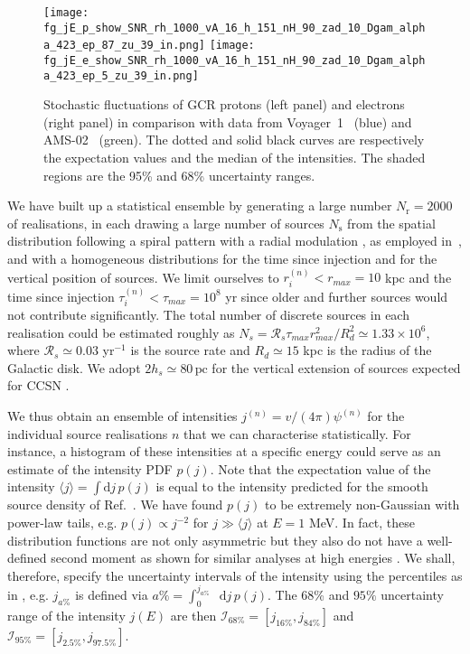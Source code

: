 \documentclass[%
reprint,
amsmath,amssymb,
aps,
superscriptaddress,
preprintnumbers
]{revtex4-2}
\newcommand*\df{\mathop{}\!\mathrm{d}}
\begin{document}
\begin{figure*}[htpb]
\centerline{
\texttt{[image: fg\_jE\_p\_show\_SNR\_rh\_1000\_vA\_16\_h\_151\_nH\_90\_zad\_10\_Dgam\_alpha\_423\_ep\_87\_zu\_39\_in.png]}
\texttt{[image: fg\_jE\_e\_show\_SNR\_rh\_1000\_vA\_16\_h\_151\_nH\_90\_zad\_10\_Dgam\_alpha\_423\_ep\_5\_zu\_39\_in.png]}
}
\caption{Stochastic fluctuations of GCR protons (left panel) and electrons (right panel) in comparison with data from Voyager~1~\cite{cummings2016} (blue) and AMS-02~\cite{AMS2014,AMS2015} (green). The dotted and solid black curves are respectively the expectation values and the median of the intensities. The shaded regions are the 95\% and 68\% uncertainty ranges.}
\label{fg:stochastic}
\end{figure*}

We have built up a statistical ensemble by generating a large number $N_\text{r}=2000$ of realisations, in each drawing a large number of sources $N_\text{s}$ from the spatial distribution following a spiral pattern \citep{vallee2005} with a radial modulation \citep{case1998}, as employed in~\cite{mertsch2011}, and with a homogeneous distributions for the time since injection and for the vertical position of sources. We limit ourselves to $r_i^{(n)}< r_{max}=10$ kpc and the time since injection $\tau_{i}^{(n)}<\tau_{max}=10^8$ yr since older and further sources would not contribute significantly. The total number of discrete sources in each realisation could be estimated roughly as $N_{s}=\mathcal{R}_{s}\tau_{max}r_{max}^2/R_d^2\simeq 1.33\times 10^6$, where $\mathcal{R}_{s}\simeq 0.03$ yr$^{-1}$ is the source rate and $R_d\simeq 15$ kpc is the radius of the Galactic disk. We adopt $2h_s\simeq 80 \, \text{pc}$ for the vertical extension of sources expected for CCSN \citep{prantzos2011}.

We thus obtain an ensemble of intensities \mbox{$j^{(n)} = v/(4 \pi) \psi^{(n)}$} for the individual source realisations $n$ that we can characterise statistically. For instance, a histogram of these intensities at a specific energy could serve as an estimate of the intensity PDF $p(j)$. Note that the expectation value of the intensity $\langle j \rangle = \int \mathrm{d} j \, p(j)$ is equal to the intensity predicted for the smooth source density of Ref.~\cite{mertsch2011}. We have found $p(j)$ to be extremely non-Gaussian with power-law tails, e.g. $p(j) \propto j^{-2}$ for $j \gg \langle j \rangle$ at $E=1$ MeV. In fact, these distribution functions are not only asymmetric but they also do not have a well-defined second moment as shown for similar analyses at high energies \citep{mertsch2011,blasi2012,bernard2012,genolini2017}. We shall, therefore, specify the uncertainty intervals of the intensity using the percentiles as in \citep{mertsch2011}, e.g. $j_{a\%}$ is defined via $a\%=\int_0^{j_{a\%}} \df j \, p(j)$. The $68$\% and $95\%$ uncertainty range of the intensity $j(E)$ are then $\mathcal{I}_{68\%}=\left[j_{16\%},j_{84\%}\right]$ and $\mathcal{I}_{95\%}=\left[j_{2.5\%},j_{97.5\%}\right]$.
\end{document}

